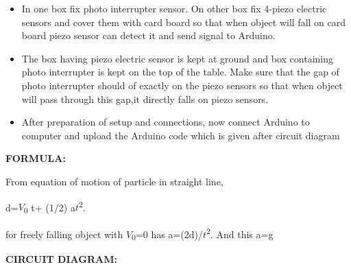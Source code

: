 \documentclass[12pt]{article}
\begin{document}
\begin{itemize}
	\item {\fontsize{14pt}{16.8pt}\selectfont In one box fix photo interrupter sensor. On other box fix 4-piezo electric sensors and cover them with card board so that when object will fall on card board piezo sensor can detect it and send signal to Arduino.\par}\par

	\item {\fontsize{14pt}{16.8pt}\selectfont The box having piezo electric sensor is kept at ground and box containing photo interrupter is kept on the top of the table. Make sure that the gap of photo interrupter should of exactly on the piezo sensors so that when object will pass through this gap,it directly falls on piezo sensors.\par}\par

	\item {\fontsize{14pt}{16.8pt}\selectfont After preparation of setup and connections, now connect Arduino to computer and upload the Arduino code which is given after circuit diagram\par}
\end{itemize}\par

\vspace{\baselineskip}
{\fontsize{14pt}{16.8pt}\selectfont \textbf{FORMULA:}\par}\par

\vspace{\baselineskip}
{\fontsize{14pt}{16.8pt}\selectfont From equation of motion of particle in straight line,\par}\par

\vspace{\baselineskip}
{\fontsize{14pt}{16.8pt}\selectfont  d=$V$\textsubscript{0} t+ (1/2) a$t$\textsuperscript{2}. \par}\par

{\fontsize{14pt}{16.8pt}\selectfont for freely falling object with $V$\textsubscript{0}=0 has a=(2d)/$t$\textsuperscript{2}. And this a=g\par}\par

\vspace{\baselineskip}

\vspace{\baselineskip}
{\fontsize{14pt}{16.8pt}\selectfont \textbf{CIRCUIT DIAGRAM:}\par}\par
\end{document}
